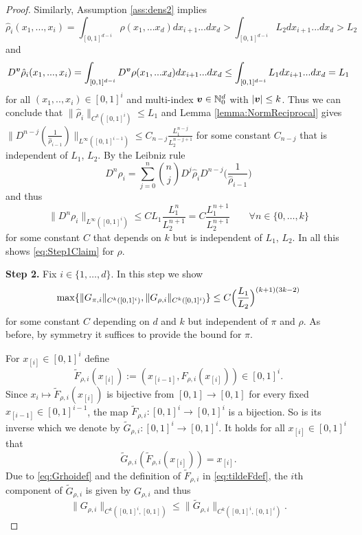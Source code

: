 \begin{proof}
  Similarly, Assumption \ref{ass:dens2} implies $$\hat\rho_i(x_1,...,x_i) = \int_{[0,1]^{d-i}}\rho(x_1,...x_d)dx_{i+1}...dx_d >  \int_{[0,1]^{d-i}}L_2dx_{i+1}...dx_d > L_2$$ and $$D^{\boldsymbol v}\hat\rho_i(x_1,...,x_i) = \int_{[0,1]^{d-i}}D^{\boldsymbol v}\rho(x_1,...x_d)dx_{i+1}...dx_d \leq \int_{[0,1]^{d-i}}L_1dx_{i+1}...dx_d = L_1$$ for all $(x_1,..,x_i)\in [0,1]^i$ and multi-index ${\boldsymbol v}\in\mathbb{N}_0^d$ with $|{\boldsymbol v}|\leq k$. Thus we can conclude that $\|\hat\rho_i\|_{C^k([0,1]^i)}\le L_1$ and Lemma \ref{lemma:NormReciprocal}
  gives
  $\|D^{n-j}(\frac{1}{\hat{\rho}_{i-1}})\|_{L^\infty([0,1]^{i-1})}
  \leq C_{n-j}\frac{L_1^{n-j}}{L_2^{n-j+1}}$ for some constant
  $C_{n-j}$ that is independent of $L_1$, $L_2$. By the Leibniz rule
  \begin{equation*}
    D^n\rho_i = \sum_{j=0}^n {n \choose j}D^j\hat{\rho}_i
    D^{n-j}\Big(\frac{1}{\hat{\rho}_{i-1}}\Big)
  \end{equation*}
  and thus
  \begin{equation*}
    \|D^{n}\rho_i\|_{L^\infty([0,1]^{i})} \le CL_1\frac{L_1^n}{L_2^{n+1}} =
    C\frac{L_1^{n+1}}{L_2^{n+1}}    \qquad\forall n\in\{0,\dots,k\}
  \end{equation*}
  for some constant $C$ that depends on $k$ but is independent of
  $L_1$, $L_2$. In all this shows \eqref{eq:Step1Claim} for $\rho$.
  
  {\bf Step 2.}  Fix $i\in\{1,\dots,d\}$. In this step we show
  \begin{equation}\label{eq:Step2Claim}
    \max\{\|G_{\pi,i}\|_{C^k([0,1]^i)},\|G_{\rho,i}\|_{C^k([0,1]^i)}\}\le C
    \Big(\frac{L_1}{L_2}\Big)^{(k+1)(3k-2)}
  \end{equation}
  for some constant $C$ depending on $d$ and $k$ but independent of
  $\pi$ and $\rho$. As before, by symmetry it suffices to provide the
  bound for $\pi$.

  For $x_{[i]}\in[0,1]^i$ define
  \begin{equation}\label{eq:tildeFdef}
    \tilde{F}_{\rho, i}(x_{[i]}) := (x_{[i-1]}, F_{\rho,
      i}(x_{[i]}))\in [0,1]^i.
  \end{equation}
  Since $x_i\mapsto \tilde{F}_{\rho, i}(x_{[i]})$ is bijective from
  $[0,1]\to [0,1]$ for every fixed $x_{[i-1]}\in [0,1]^{i-1}$, the map
  $\tilde{F}_{\rho, i}:[0,1]^i\to [0,1]^i$ is a bijection.  So is its
  inverse which we denote by $\tilde{G}_{\rho, i}:[0,1]^i\to [0,1]^i$.
  It holds for all $x_{[i]}\in [0,1]^i$ that
  \begin{equation*}
    \tilde{G}_{\rho, i}(\tilde{F}_{\rho, i}(x_{[i]})) =
    x_{[i]}.
  \end{equation*}
  Due to \eqref{eq:Grhoidef} and the definition of $\tilde F_{\rho,i}$
  in \eqref{eq:tildeFdef}, the $i$th component of
  $\tilde{G}_{\rho, i}$ is given by $G_{\rho,i}$ and thus
  \begin{equation*}
    \|G_{\rho,i}\|_{C^k([0,1]^i, [0,1])}\leq \|\tilde{G}_{\rho, i}\|_{C^k([0,1]^i, [0,1]^i)}.
  \end{equation*}


\end{proof}
